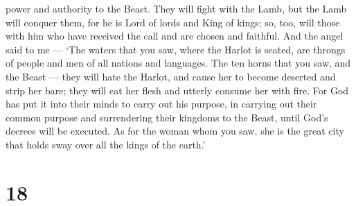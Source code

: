 power and authority to the Beast.  They will fight with the
Lamb, but the Lamb will conquer them, for he is Lord of lords and King
of kings; so, too, will those with him who have received the call and
are chosen and faithful.  And the angel said to me --- `The
waters that you saw, where the Harlot is seated, are throngs of people
and men of all nations and languages.  The ten horns that
you saw, and the Beast --- they will hate the Harlot, and cause her to
become deserted and strip her bare; they will eat her flesh and utterly
consume her with fire.  For God has put it into their minds
to carry out his purpose, in carrying out their common purpose and
surrendering their kingdoms to the Beast, until God's decrees will be
executed.  As for the woman whom you saw, she is the great
city that holds sway over all the kings of the earth.'

\hypertarget{section-17}{%
\section{18}\label{section-17}}

